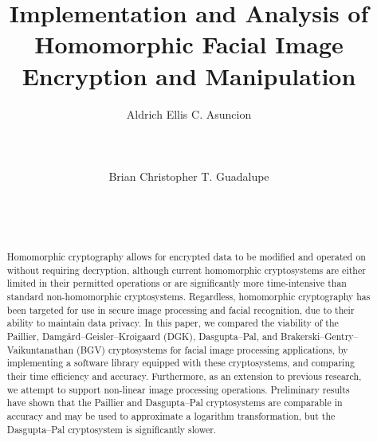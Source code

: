 \documentclass{sig-alternate-05-2015}
\begin{document}
\title{Implementation and Analysis of Homomorphic Facial Image Encryption and Manipulation}



\author{
\alignauthor Aldrich Ellis C. Asuncion\\
\\
\\
\\
\alignauthor Brian Christopher T. Guadalupe\\
\\
\\
\\
}

\maketitle

\begin{abstract}
Homomorphic cryptography allows for encrypted data to be modified and operated on without requiring decryption, although current homomorphic cryptosystems are either limited in their permitted operations or are significantly more time-intensive than standard non-homomorphic cryptosystems. Regardless, homomorphic cryptography has been targeted for use in secure image processing and facial recognition, due to their ability to maintain data privacy. In this paper, we compared the viability of the Paillier, Damg{\aa}rd--Geisler--Kr{\o}igaard (DGK), Dasgupta--Pal, and Brakerski--Gentry--Vaikuntanathan (BGV) cryptosystems for facial image processing applications, by implementing a software library equipped with these cryptosystems, and comparing their time efficiency and accuracy. Furthermore, as an extension to previous research, we attempt to support non-linear image processing operations. Preliminary results have shown that the Paillier and Dasgupta--Pal cryptosystems are comparable in accuracy and may be used to approximate a logarithm transformation, but the Dasgupta--Pal cryptosystem is significantly slower.
\end{abstract}
\end{document}
